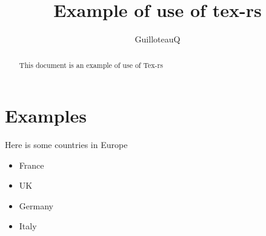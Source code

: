 \documentclass[a4paper,11pt]{article}
\title{Example of use of tex-rs}
\author{GuilloteauQ}
\begin{document}
\maketitle
\begin{abstract}
This document is an example of use of Tex-rs
\end{abstract}
\section{Examples}
Here is some countries in Europe\begin{itemize}
\item France
\item UK
\item Germany
\item Italy

\end{itemize}
\end{document}
